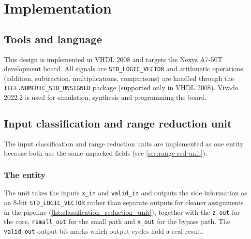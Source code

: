 
\begingroup
\makeatletter
\patchcmd{\@makechapterhead}{\vspace*{50\p@}}{\vspace*{0\p@}}{}{}
\makeatother
\chapter{Implementation}
\label{ch:implementation}
\endgroup

\section{Tools and language}
\label{sec:tools}

This design is implemented in VHDL 2008 and targets the Nexys A7-50T development board.
All signals are \lstinline|STD_LOGIC_VECTOR| and arithmetic operations (addition, subtraction,
multiplications, comparisons) are handled through the \lstinline|IEEE.NUMERIC_STD_UNSIGNED|
package (supported only in VHDL 2008). Vivado 2022.2 is used for simulation, synthesis and programming the board.

\section{Input classification and range reduction unit}
\label{sec:classification_rr}

The input classification and range reduction units are implemented as one entity because
both use the same unpacked fields (see \cref{sec:range-red-unit}).

\subsection{The entity}
\label{subsec:icrr-entity}
The unit takes the inputs \lstinline|x_in| and \lstinline|valid_in| and outputs the side information as an 8-bit \lstinline|STD_LOGIC_VECTOR|
rather than separate outputs for cleaner assignments in the pipeline (\cref{lst:classification_reduction_unit}), together with the
\lstinline|z_out| for the core, \lstinline|rsmall_out| for the small path and \lstinline|x_out|
for the bypass path. The \lstinline|valid_out| output bit marks which output cycles hold a real result.

